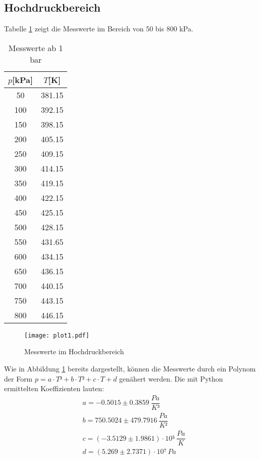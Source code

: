 \subsection{Hochdruckbereich}
  Tabelle \ref{tab:data2} zeigt die Messwerte im Bereich von 50 bis 800 kPa.
  \begin{table}[H]
    \centering
     \caption{Messwerte ab 1 bar}
     \label{tab:data2}
     \begin{tabular}{c c}
     \toprule
     $p$[kPa] & $T$[K] \\
      \midrule
       50 &   381.15 \\ 
      100 &   392.15 \\ 
      150 &   398.15 \\ 
      200 &   405.15 \\ 
      250 &   409.15 \\ 
      300 &   414.15 \\ 
      350 &   419.15 \\ 
      400 &   422.15 \\ 
      450 &   425.15 \\ 
      500 &   428.15 \\ 
      550 &   431.65 \\ 
      600 &   434.15 \\ 
      650 &   436.15 \\ 
      700 &   440.15 \\ 
      750 &   443.15 \\ 
      800 &   446.15 \\ 
     \bottomrule
    \end{tabular}
  \end{table}
  \begin{figure}[H]
   \centering
   \texttt{[image: plot1.pdf]}
   \caption{Messwerte im Hochdruckbereich}
   \label{fig:plot1}
  \end{figure}
  \noindent Wie in Abbildung \ref{fig:plot1} bereits dargestellt, können die Messwerte durch ein Polynom
  der Form $p = a \cdot T³ + b \cdot T² + c \cdot T + d$ genähert werden. Die mit Python
  ermittelten Koeffizienten lauten:
  \begin{align*}
    & a = -0.5015 \pm 0.3859 \ \dfrac{Pa}{K³}\\
    & b = 750.5024 \pm 479.7916 \ \dfrac{Pa}{K²}\\
    & c = (-3.5129 \pm 1.9861) \cdot 10⁵ \ \dfrac{Pa}{K}\\
    & d = (5.269 \pm 2.7371) \cdot 10⁷ \ Pa\\
  \end{align*}
